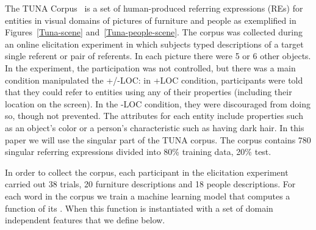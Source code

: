 \label{tunaDescription}The TUNA Corpus~\cite{gatt-balz-kow:2008:ENLG} is a set of human-produced referring expressions (REs) for entities in visual domains of pictures of furniture and people as exemplified in Figures~\ref{Tuna-scene} and~\ref{Tuna-people-scene}. The corpus was
collected during an online elicitation experiment in which subjects typed descriptions of a target single referent or pair of referents. 
In each picture there were 5 or 6 other objects. 
In the experiment, the participation was not controlled, but there was a main condition manipulated the +/-LOC: in +LOC condition, participants were told that they could refer to entities using any of their properties (including their location on the screen). In the -LOC condition, they were discouraged from doing so, though not prevented. 
The attributes for each entity include properties such as an object's color or a person's characteristic such as having dark hair.
In this paper we will use the singular part of the TUNA corpus. The corpus contains 780 singular referring expressions divided
into 80\% training data, 20\% test. 

In order to collect the corpus, each participant in the elicitation experiment carried out 38 trials, 20 furniture descriptions and 18 people descriptions. For each word in the corpus we train a machine learning model that computes a function of its \puse. When this function is instantiated with a set of domain independent features that we define below. 


